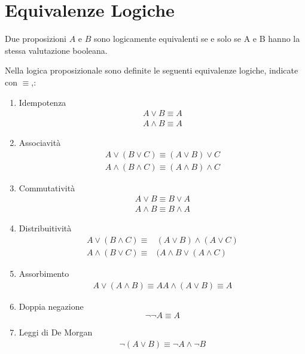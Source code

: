 \section{Equivalenze Logiche}
Due proposizioni $A$ e $B$ sono logicamente equivalenti se e solo se A e B hanno
la stessa valutazione booleana.

Nella logica proposizionale sono definite le seguenti equivalenze logiche, indicate con $\equiv$,:
\begin{enumerate}
    \item Idempotenza
            \begin{align*}
                A \lor B  \equiv  A \\
                A \land B  \equiv  A
            \end{align*}
    \item Associavità
            \begin{align*}
                A \lor (B \lor C) \equiv  (A \lor B) \lor C \\
                A \land (B \land C)  \equiv  (A \land B) \land C
            \end{align*}
    \item Commutatività
            \begin{align*}
                A \lor B  \equiv  B \lor A \\
                A \land B  \equiv  B \land A
            \end{align*}
    \item Distribuitività
            \begin{align*}
                A \lor (B \land C)  \equiv & (A \lor B) \land (A \lor C)\\
                A \land (B \lor C)  \equiv & (A \land B \lor (A \land C)
            \end{align*}
    \item Assorbimento
            \begin{align*}
                A \lor (A \land B)  \equiv  A
                A \land (A \lor B)  \equiv  A
            \end{align*}
    \item Doppia negazione
                \begin{equation*}
                    \neg \neg A \equiv A
                \end{equation*}
    \item Leggi di De Morgan
            \begin{align*}
                \neg (A \lor B)  \equiv  \neg A \land \neg B \\

\end{align*}
\end{enumerate}
